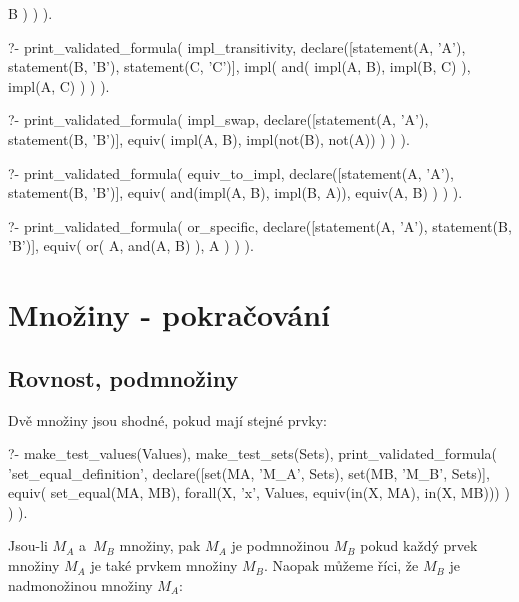 \begin{fact}
\begin{prolog}
			B
		)
	)
).
\end{prolog}
\begin{prolog}
?- print_validated_formula(
	impl_transitivity,
	declare([statement(A, 'A'), statement(B, 'B'), statement(C, 'C')],
		impl(
			and(
				impl(A, B),
				impl(B, C)
			),
			impl(A, C)
		)
	)
).
\end{prolog}
\begin{prolog}
?- print_validated_formula(
	impl_swap,
	declare([statement(A, 'A'), statement(B, 'B')],
		equiv(
			impl(A, B),
			impl(not(B), not(A))
		)
	)
).
\end{prolog}
\begin{prolog}
?- print_validated_formula(
	equiv_to_impl,
	declare([statement(A, 'A'), statement(B, 'B')],
		equiv(
			and(impl(A, B), impl(B, A)),
			equiv(A, B)
		)
	)
).
\end{prolog}
\begin{prolog}
?- print_validated_formula(
	or_specific,
	declare([statement(A, 'A'), statement(B, 'B')],
		equiv(
			or(
				A,
				and(A, B)
			),
			A
		)
	)
).
\end{prolog}
\end{fact}

\section{Množiny - pokračování}

\subsection{Rovnost, podmnožiny}
Dvě množiny jsou shodné, pokud mají stejné prvky:

\begin{prolog}
?- 	make_test_values(Values),
	make_test_sets(Sets),
	print_validated_formula(
		'set_equal_definition',
		declare([set(MA, 'M_A', Sets), set(MB, 'M_B', Sets)],
			equiv(
				set_equal(MA, MB),
				forall(X, 'x', Values, equiv(in(X, MA), in(X, MB)))
			)
		)
	).
\end{prolog}

Jsou-li \(M_A\) a~\(M_B\) množiny, pak \(M_A\) je podmnožinou \(M_B\) pokud každý prvek množiny \(M_A\) je také prvkem množiny \(M_B\). Naopak můžeme říci, že \(M_B\) je nadmonožinou množiny \(M_A\):

